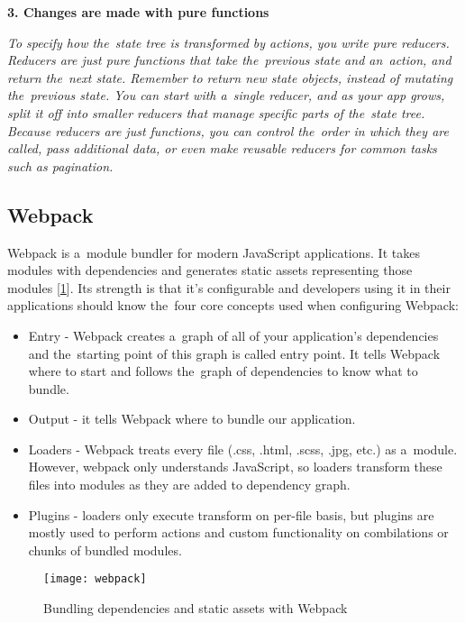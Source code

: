 \textbf{3. Changes are made with pure functions}

\textsl{To specify how the~state tree is transformed by actions, you write pure reducers. Reducers are just pure functions that take the~previous state and an~action, and return the~next state. Remember to return new state objects, instead of mutating the~previous state. You can start with a~single reducer, and as your app grows, split it off into smaller reducers that manage specific parts of the~state tree. Because reducers are just functions, you can control the~order in which they are called, pass additional data, or even make reusable reducers for common tasks such as pagination.} \citep{redux-intro}

\subsection{Webpack}
Webpack is a~module bundler for modern JavaScript applications. It takes modules with dependencies and generates static assets representing those modules [\ref{r:45}]. Its strength is that it's configurable and developers using it in their applications should know the~four core concepts used when configuring Webpack:

\begin{itemize}
\item Entry - Webpack creates a~graph of all of your application's dependencies and the~starting point of this graph is called entry point. It tells Webpack where to start and follows the~graph of dependencies to know what to bundle.
\item Output - it tells Webpack where to bundle our application.
\item Loaders - Webpack treats every file (.css, .html, .scss, .jpg, etc.) as a~module. However, webpack only understands JavaScript, so loaders transform these files into modules as they are added to dependency graph.
\item Plugins - loaders only execute transform on per-file basis, but plugins are mostly used to perform actions and custom functionality on combilations or chunks of bundled modules.
\end{itemize}

\begin{figure}[ht!]
\centering
\texttt{[image: webpack]}
\caption{Bundling dependencies and static assets with Webpack}
\label{r:45}
\end{figure}